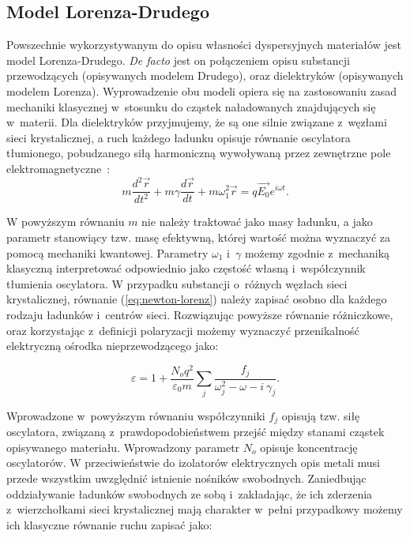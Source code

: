 \subsection{Model Lorenza-Drudego}
\label{subart:lorenz-drude}
Powszechnie wykorzystywanym do opisu własności dyspersyjnych materiałów jest model Lorenza-Drudego. \textit{De facto} jest on połączeniem opisu substancji przewodzących (opisywanych modelem Drudego), oraz dielektryków (opisywanych modelem Lorenza). Wyprowadzenie obu modeli opiera się na zastosowaniu zasad mechaniki klasycznej w~stosunku do cząstek naładowanych znajdujących się w~materii. Dla dielektryków przyjmujemy, że są one silnie związane z~węzłami sieci krystalicznej, a ruch każdego ładunku opisuje równanie oscylatora tłumionego, pobudzanego siłą harmoniczną wywoływaną przez zewnętrzne pole elektromagnetyczne~\cite{griffiths1999introduction}:
\begin{equation}
m \frac{d^2 \vec{r}}{dt^2} + m \gamma \frac{d \vec{r}}{dt} + m \omega^2_1 \vec{r} = q \vec{E_0} e^{i \omega t}.
\label{eq:newton-lorenz}
\end{equation}

W powyższym równaniu $m$ nie należy traktować jako masy ładunku, a jako parametr stanowiący tzw. masę efektywną, której wartość można wyznaczyć za pomocą mechaniki kwantowej. Parametry $\omega_1$ i~$\gamma$ możemy zgodnie z~mechaniką klasyczną interpretować odpowiednio jako częstość własną i~współczynnik tłumienia oscylatora. W przypadku substancji o~różnych węzłach sieci krystalicznej, równanie (\ref{eq:newton-lorenz}) należy zapisać osobno dla każdego rodzaju ładunków i~centrów sieci. Rozwiązując powyższe równanie różniczkowe, oraz korzystając z~definicji polaryzacji możemy wyznaczyć przenikalność elektryczną ośrodka nieprzewodzącego jako:

\begin{equation}
\varepsilon = 1 + \frac{N_o q^2}{\varepsilon_0 m} \sum_j \frac{f_j}{\omega_j^2 - \omega - i~\gamma_j}.
\label{eq:lorenz}
\end{equation}

Wprowadzone w~powyższym równaniu współczynniki $f_j$ opisują tzw. siłę oscylatora, związaną z~prawdopodobieństwem przejść między stanami cząstek opisywanego materiału. Wprowadzony parametr $N_o$ opisuje koncentrację oscylatorów.  W przeciwieństwie do izolatorów elektrycznych opis metali musi przede wszystkim uwzględnić istnienie nośników swobodnych. Zaniedbując oddziaływanie ładunków swobodnych ze sobą i~zakładając, że ich zderzenia z~wierzchołkami sieci krystalicznej mają charakter w~pełni przypadkowy możemy ich klasyczne równanie ruchu zapisać jako:

